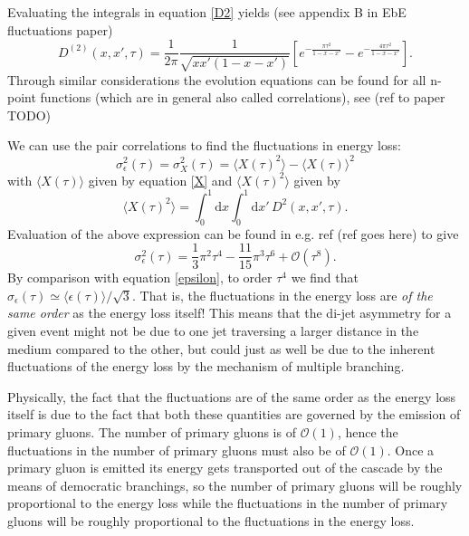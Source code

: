 \documentclass[a4paper,12pt]{article}
\numberwithin{equation}{section}
\begin{document}
Evaluating the integrals in equation \eqref{D2} yields (see appendix B in EbE fluctuations paper)
\begin{equation}
D^{(2)}(x,x',\tau)=\frac{1}{2\pi}\frac{1}{\sqrt{xx'(1-x-x')}}\left[ e^{-\frac{\pi \tau^2}{1-x-x'}} -e^{-\frac{4 \pi \tau^2}{1-x-x'}} \right].
\end{equation}
Through similar considerations the evolution equations can be found for all n-point functions (which are in general also called correlations), see (ref to paper TODO)


We can use the pair correlations to find the fluctuations in energy loss:
\begin{equation}
\sigma_\epsilon^2(\tau)=\sigma_X^2(\tau) = \langle X(\tau)^2 \rangle - \langle X(\tau)\rangle ^2 
\end{equation}
with $\langle X(\tau)\rangle$ given by equation \eqref{X} and $\langle X(\tau)^2 \rangle$ given by
\begin{equation}
\langle X(\tau)^2 \rangle =\int_0^1 \mathrm{d}x \int_0^1 \mathrm{d}x'\, D^2(x,x',\tau).
\end{equation}
Evaluation of the above expression can be found in e.g. ref (ref goes here) to give 
\begin{equation}
\sigma_\epsilon^2(\tau) = \frac{1}{3}\pi^2\tau^4 - \frac{11}{15}\pi^3 \tau^6 + \mathcal{O}(\tau^8).
\end{equation}
By comparison with equation \eqref{epsilon}, to order $\tau^4$ we find that $\sigma_\epsilon(\tau)\simeq \langle \epsilon(\tau)\rangle/\sqrt{3}$. That is, the fluctuations in the energy loss are \emph{of the same order} as the energy loss itself! This means that the di-jet asymmetry for a given event might not be due to one jet traversing a larger distance in the medium compared to the other, but could just as well be due to the inherent fluctuations of the energy loss by the mechanism of multiple branching. 


Physically, the fact that the fluctuations are of the same order as the energy loss itself is due to the fact that both these quantities are governed by the emission of primary gluons. The number of primary gluons is of $\mathcal{O}(1)$, hence the fluctuations in the number of primary gluons must also be of $\mathcal{O}(1)$. Once a primary gluon is emitted its energy gets transported out of the cascade by the means of democratic branchings, so the number of primary gluons will be roughly proportional to the energy loss while the fluctuations in the number of primary gluons will be roughly proportional to the fluctuations in the energy loss.
\end{document}
